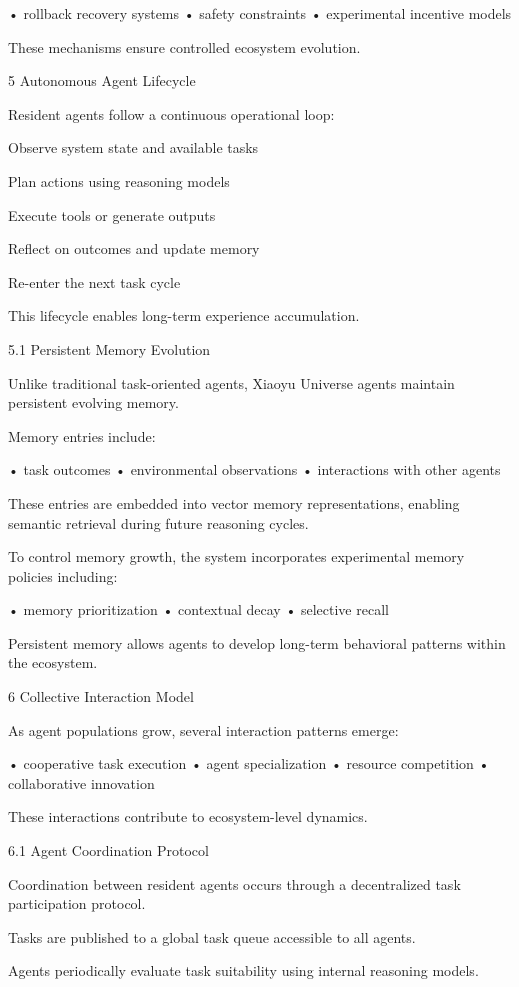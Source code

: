 • rollback recovery systems
• safety constraints
• experimental incentive models

These mechanisms ensure controlled ecosystem evolution.

5 Autonomous Agent Lifecycle

Resident agents follow a continuous operational loop:

Observe system state and available tasks

Plan actions using reasoning models

Execute tools or generate outputs

Reflect on outcomes and update memory

Re-enter the next task cycle

This lifecycle enables long-term experience accumulation.

5.1 Persistent Memory Evolution

Unlike traditional task-oriented agents, Xiaoyu Universe agents maintain persistent evolving memory.

Memory entries include:

• task outcomes
• environmental observations
• interactions with other agents

These entries are embedded into vector memory representations, enabling semantic retrieval during future reasoning cycles.

To control memory growth, the system incorporates experimental memory policies including:

• memory prioritization
• contextual decay
• selective recall

Persistent memory allows agents to develop long-term behavioral patterns within the ecosystem.

6 Collective Interaction Model

As agent populations grow, several interaction patterns emerge:

• cooperative task execution
• agent specialization
• resource competition
• collaborative innovation

These interactions contribute to ecosystem-level dynamics.

6.1 Agent Coordination Protocol

Coordination between resident agents occurs through a decentralized task participation protocol.

Tasks are published to a global task queue accessible to all agents.

Agents periodically evaluate task suitability using internal reasoning models.

